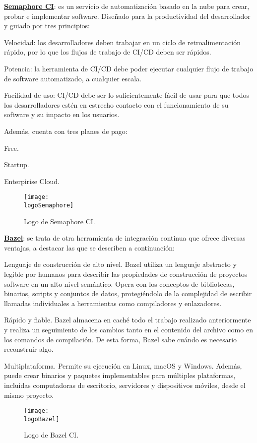 \begin{compactitem}
    \item \textbf{\underline{Semaphore CI}}: es un servicio de automatización basado en la nube para crear, probar e implementar software. Diseñado para la productividad del desarrollador y guiado por tres principios:
    \begin{compactitem}
        \item Velocidad: los desarrolladores deben trabajar en un ciclo de retroalimentación rápido, por lo que los flujos de trabajo de CI/CD deben ser rápidos.
        \item Potencia: la herramienta de CI/CD debe poder ejecutar cualquier flujo de trabajo de software automatizado, a cualquier escala.
        \item Facilidad de uso: CI/CD debe ser lo suficientemente fácil de usar para que todos los desarrolladores estén en estrecho contacto con el funcionamiento de su software y su impacto en los usuarios.
    \end{compactitem}
    Además, cuenta con tres planes de pago:
    \begin{compactitem}
        \item Free.
        \item Startup.
        \item Enterpirise Cloud.
    \end{compactitem}

    \begin{figure}[h]
        \centering
        \texttt{[image: \\logoSemaphore]}
        \caption{Logo de Semaphore CI.}
    \end{figure}
    \item \textbf{\underline{Bazel}}: se trata de otra herramienta de integración continua que ofrece diversas ventajas, a destacar las que se describen a continuación:
    \begin{compactitem}
        \item Lenguaje de construcción de alto nivel. Bazel utiliza un lenguaje abstracto y legible por humanos para describir las propiedades de construcción de proyectos software en un alto nivel semántico. Opera con los conceptos de bibliotecas, binarios, scripts y conjuntos de datos, protegiéndolo de la complejidad de escribir llamadas individuales a herramientas como compiladores y enlazadores.
        \item Rápido y fiable. Bazel almacena en caché todo el trabajo realizado anteriormente y realiza un seguimiento de los cambios tanto en el contenido del archivo como en los comandos de compilación. De esta forma, Bazel sabe cuándo es necesario reconstruir algo.
        \item Multiplataforma. Permite su ejecución en Linux, macOS y Windows. Además, puede crear binarios y paquetes implementables para múltiples plataformas, incluidas computadoras de escritorio, servidores y dispositivos móviles, desde el mismo proyecto.
    \end{compactitem}
    \begin{figure}[h]
        \centering
        \texttt{[image: \\logoBazel]}
        \caption{Logo de Bazel CI.}
    \end{figure}


\end{compactitem}
